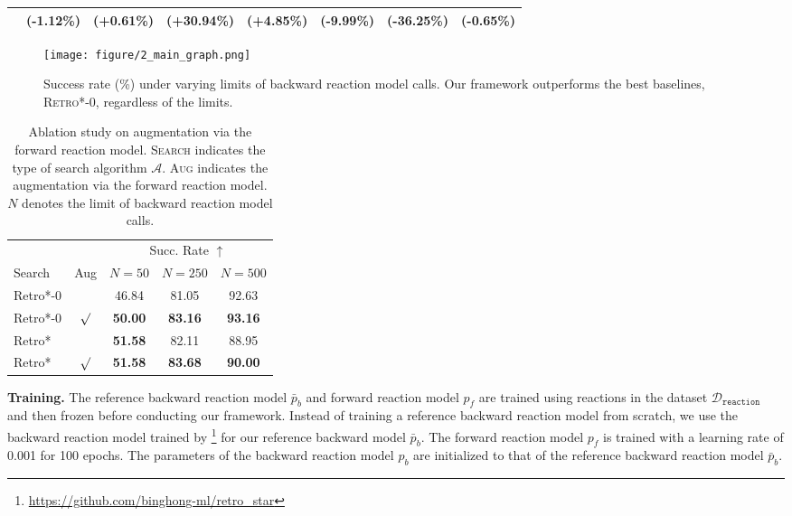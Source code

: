 \begin{table*}[ht!]
\begin{center}
\begin{sc}
{\begin{tabular}{l cc ccccc}
\rowcolor{Gray} & (-1.12\%) & (+0.61\%) & (+30.94\%) & (+4.85\%) & (-9.99\%) & (-36.25\%) & (-0.65\%) \\
\bottomrule
\end{tabular}}
\end{sc}
\end{center}
\vskip -0.1in
\end{table*} \begin{figure}[t]
\vspace{0.1in}
    \centering
    \texttt{[image: figure/2\_main\_graph.png]}
    \caption{Success rate (\%) under varying limits of backward reaction model calls. Our framework outperforms the best baselines, \textsc{Retro*-0}, regardless of the limits.}
    \label{fig:main_graph}
\end{figure} \begin{table}[t]
\caption{Ablation study on augmentation via the forward reaction model. \textsc{Search} indicates the type of search algorithm $\mathcal{A}$. \textsc{Aug} indicates the augmentation via the forward reaction model. $N$ denotes the limit of backward reaction model calls.} 
\label{tab:3_ablation_aug}
\vskip 0.1in
\begin{center}
\begin{sc}
\begin{tabular}{lc ccc}
\toprule
& &
\multicolumn{3}{c}{Succ. Rate $\uparrow$} \\
\cmidrule(lr){3-5}
Search & Aug & $N=50$ & $N=250$ & $N=500$ \\
\midrule
Retro*-0 &         & 46.84 & 81.05 & 92.63 \\
Retro*-0 & $\surd$ & \textbf{50.00} & \textbf{83.16} & \textbf{93.16} \\
\midrule
Retro* &         & \textbf{51.58} & 82.11 & 88.95 \\
Retro* & $\surd$ & \textbf{51.58} & \textbf{83.68} & \textbf{90.00} \\
\bottomrule
\end{tabular}
\end{sc}
\end{center}
\vskip -0.1in
\end{table} \textbf{Training.}
The reference backward reaction model $\bar{p}_{b}$ and forward reaction model $p_{f}$ are trained using reactions in the dataset $\mathcal{D}_{\mathtt{reaction}}$ and then frozen before conducting our framework. Instead of training a reference backward reaction model from scratch, we use the backward reaction model trained by \citet{chen2020retro}\footnote{\url{https://github.com/binghong-ml/retro\_star}} for our reference backward model $\bar{p}_{b}$. The forward reaction model $p_{f}$ is trained with a learning rate of 0.001 for 100 epochs. The parameters of the backward reaction model $p_{b}$ are initialized to that of the reference backward reaction model $\bar{p}_{b}$. 
